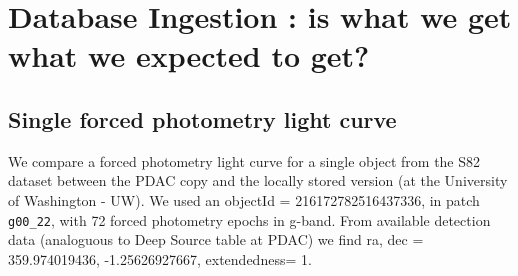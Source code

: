 \documentclass[DM,lsstdraft,toc,usenatbib]{lsstdoc}
\begin{document}
\section{Database Ingestion : is what we get what we expected to get? }
\label{sec:dg}

\subsection{Single forced photometry light curve}

We compare a forced photometry light curve for a single object from the S82 dataset between the PDAC copy and the locally stored version (at the University of Washington - UW). We used an objectId = 216172782516437336, in patch \verb|g00_22|, with  72 forced photometry epochs in g-band. From available detection data (analoguous to Deep Source table at PDAC) we find ra, dec = 359.974019436\degree,  -1.25626927667\degree, extendedness= 1.
\end{document}
